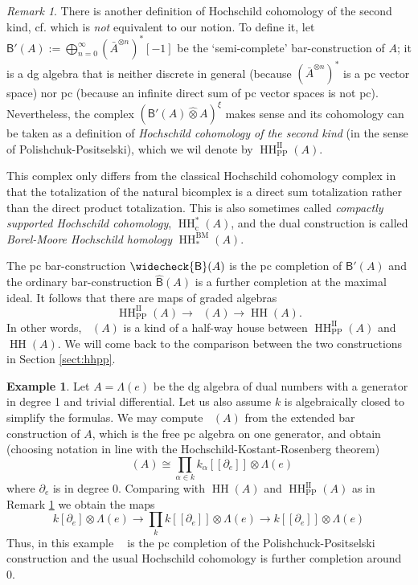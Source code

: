 \documentclass[a4paper]{amsart}
\theoremstyle{plain}
\theoremstyle{definition}
\newtheorem{exmp}[thm]{Example}
\theoremstyle{remark}
\newtheorem{rem}[thm]{Remark}
\DeclareMathOperator{\HH}{HH}
\DeclareMathOperator{\HHII}{HH^{\mathrm{II}}}
\newcommand{\cB}{\widecheck{\mathsf{B}}}
\newcommand{\hB}{\widehat{\mathsf{B}}}
\numberwithin{equation}{section}
\theoremstyle{plain}
\begin{document}
	\begin{rem}\label{remark:comparison}
		There is another definition of Hochschild cohomology of the second kind, cf. \cite{pp12} which is \emph{not} equivalent to our notion. To define it, let $\mathsf{B}'(A):=\bigoplus_{n=0}^{\infty} (\bar{A}^{\otimes n})^*[-1]$ 
		be the `semi-complete' bar-construction of $A$; it is a dg algebra that is neither discrete in general (because 
		$(\bar{A}^{\otimes n})^*$ is a pc vector space) nor pc (because an infinite direct sum of pc vector spaces is not pc).
		Nevertheless, the complex $(\mathsf{B}'(A)\hat{\otimes}A)^{\xi}$ makes sense and its cohomology can be taken as a definition of \emph{Hochschild cohomology of the second kind} (in the sense of Polishchuk-Positselski), which we wil denote by $\HH^{\mathrm{II}}_{\mathrm{PP}}(A)$.
		
		This complex only differs from the classical Hochschild cohomology complex in that the totalization of the natural bicomplex is a direct sum totalization rather than the direct product totalization.
		This is also sometimes called 
		\emph{compactly supported Hochschild cohomology}, 
		$\HH^*_{\mathrm{c}}(A)$, and the dual construction is called \emph{Borel-Moore Hochschild homology} $\HH_*^{\textrm{BM}}(A)$. 
		
		The pc bar-construction $\cB(A)$ is the pc completion of $\mathsf B'(A)$ and the ordinary bar-construction $\hB(A)$ is a further completion at the maximal ideal. It follows that there are maps of graded algebras 
		$$\HH^{\mathrm{II}}_{\mathrm{PP}}(A)\to \HHII(A)\to \HH(A).$$ In other words, $\HHII(A)$ is a kind of a half-way house between $\HH^{\mathrm{II}}_{\mathrm{PP}}(A)$ and  $\HH(A)$.
		We will come back to the comparison between the two constructions in Section \ref{sect:hhpp}. 
	\end{rem}	
	\begin{exmp}
		Let $A = \Lambda(e)$ be the dg algebra of dual numbers with a generator in degree 1 and trivial differential.	
		Let us also assume $k$ is algebraically closed to simplify the formulas.
		We may compute $\HHII(A)$ from the extended bar construction of $A$, which is the free pc algebra on one generator, and obtain (choosing notation in line with the Hochschild-Kostant-Rosenberg theorem)
		$$\HHII(A) \cong \prod_{\alpha \in k} k_\alpha[[\partial_e]]\otimes \Lambda(e)$$
		where $\partial_e$ is in degree 0.
		Comparing with $\HH(A)$ and $\HH^{\mathrm{II}}_{\mathrm{PP}}(A)$ as in
		Remark \ref{remark:comparison} we obtain the maps
		$$k[\partial_e] \otimes \Lambda(e) \to \prod_{k} k[[\partial_e]] \otimes \Lambda(e) \to k[[\partial_e]]\otimes \Lambda(e)$$
		Thus, in this example $\HHII$ is the pc completion of the Polishchuck-Positselski construction and the usual Hochschild cohomology is further completion around 0.
	\end{exmp}
	
\end{document}
